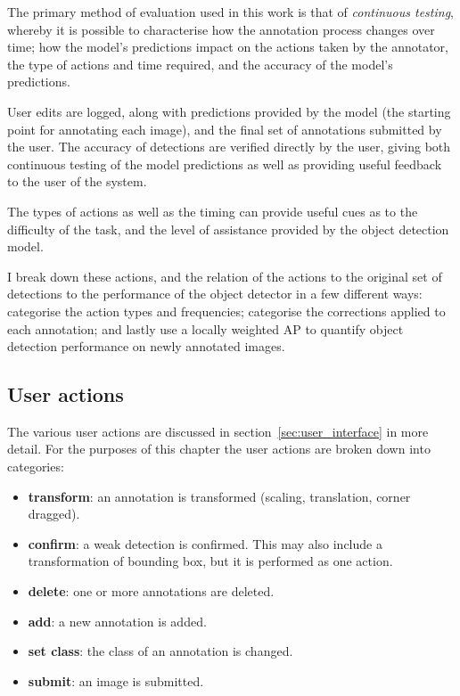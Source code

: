 The primary method of evaluation used in this work is that of \emph{continuous testing}, whereby it is possible to characterise how the annotation process changes over time; how the model's predictions impact on the actions taken by the annotator, the type of actions and time required, and the accuracy of the model's predictions.

User edits are logged, along with predictions provided by the model (the starting point for annotating each image), and the final set of annotations submitted by the user. The accuracy of detections are verified directly by the user, giving both continuous testing of the model predictions as well as providing useful feedback to the user of the system. 

The types of actions as well as the timing can provide useful cues as to the difficulty of the task, and the level of assistance provided by the object detection model. 

I break down these actions, and the relation of the actions to the original set of detections to the performance of the object detector in a few different ways: categorise the action types and frequencies; categorise the corrections applied to each annotation; and lastly use a locally weighted \gls{AP} to quantify object detection performance on newly annotated images.

\subsection{User actions}

The various user actions are discussed in section~\ref{sec:user_interface} in more detail. For the purposes of this chapter the user actions are broken down into categories:

\begin{itemize}
    \item {\bf transform}: an annotation is transformed (scaling, translation, corner dragged).
    \item {\bf confirm}: a weak detection is confirmed. This may also include a transformation of bounding box, but it is performed as one action.
    \item {\bf delete}: one or more annotations are deleted.
    \item {\bf add}: a new annotation is added.
    \item {\bf set class}: the class of an annotation is changed.    
    \item {\bf submit}: an image is submitted.    
\end{itemize}

